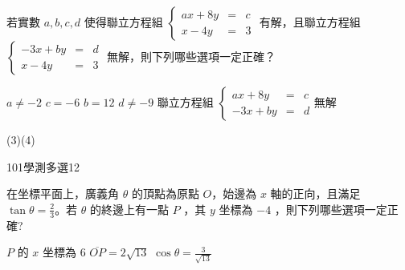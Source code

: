 \begin{QUESTIONS}
\begin{QUESTION}
\begin{ExamAnsRateInfo}{37}{62}{29}{20}
        \end{ExamAnsRateInfo}
        \begin{QBODY}
			若實數 $a, b, c,  d$ 使得聯立方程組
			$\left\{\begin{array}{ccc} ax+8y & = & c \\ x-4y & = & 3 \end{array}\right.$
			有解，且聯立方程組 $\left\{\begin{array}{ccc} -3x+by & = & d \\ x-4y & = & 3 \end{array}\right.$
			無解，則下列哪些選項一定正確？ 
			\begin{QOPS} 
				\QOP  $a \neq -2$
				\QOP  $c = -6$    
				\QOP  $b =12$    
				\QOP  $d \neq -9$ 
				\QOP  聯立方程組 $\left\{\begin{array}{ccc} ax+8y & = & c \\ -3x+by & = & d \end{array}\right.$無解
			\end{QOPS}
        \end{QBODY}
        \begin{QFROMS}
        \end{QFROMS}
        \begin{QTAGS}\end{QTAGS}
        \begin{QANS}
            (3)(4)
        \end{QANS}
        \begin{QSOLLIST}
        \end{QSOLLIST}
        \begin{QEMPTYSPACE}
        \end{QEMPTYSPACE}
    \end{QUESTION}
    \begin{QUESTION}
        \begin{ExamInfo}{101}{學測}{多選}{12}
        \end{ExamInfo}
        \begin{ExamAnsRateInfo}{42}{64}{40}{22}
        \end{ExamAnsRateInfo}
        \begin{QBODY}
			在坐標平面上，廣義角 $\theta$ 的頂點為原點 $O$，始邊為 $x$ 軸的正向，且滿足 $\tan \theta =\frac{2}{3}$。若 $\theta$ 的終邊上有一點 $P$ ，其 $y$ 坐標為 $-4$ ，則下列哪些選項一定正確? 
			\begin{QOPS} 
				\QOP $P$ 的 $x$ 坐標為 6 
				\QOP $\overline{OP} = 2\sqrt{13}$ 
				\QOP $\cos\theta = \frac{3}{\sqrt{13}}$ 

\end{QOPS}
\end{QBODY}
\end{QUESTION}
\end{QUESTIONS}
